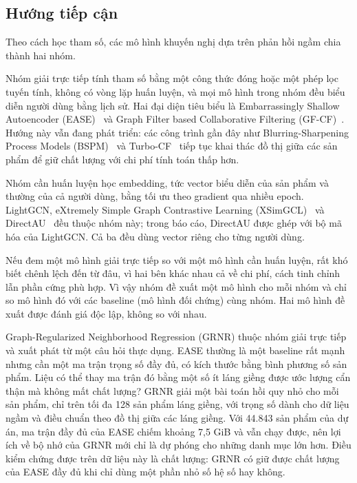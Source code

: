 \subsection{Hướng tiếp cận}
\label{sec:intro-approach}

Theo cách học tham số, các mô hình khuyến nghị dựa trên phản hồi ngầm chia thành hai nhóm.

Nhóm giải trực tiếp tính tham số bằng một công thức đóng hoặc một phép lọc tuyến tính, không có vòng lặp huấn luyện, và mọi mô hình trong nhóm đều biểu diễn người dùng bằng lịch sử. Hai đại diện tiêu biểu là Embarrassingly Shallow Autoencoder (EASE)~\cite{steck2019ease} và Graph Filter based Collaborative Filtering (GF-CF)~\cite{shen2021gfcf}. Hướng này vẫn đang phát triển: các công trình gần đây như Blurring-Sharpening Process Models (BSPM)~\cite{choi2023bspm} và Turbo-CF~\cite{park2024turbocf} tiếp tục khai thác đồ thị giữa các sản phẩm để giữ chất lượng với chi phí tính toán thấp hơn.

Nhóm cần huấn luyện học embedding, tức vector biểu diễn của sản phẩm và thường của cả người dùng, bằng tối ưu theo gradient qua nhiều epoch. LightGCN, eXtremely Simple Graph Contrastive Learning (XSimGCL)~\cite{yu2023xsimgcl} và DirectAU~\cite{wang2022directau} đều thuộc nhóm này; trong báo cáo, DirectAU được ghép với bộ mã hóa của LightGCN. Cả ba đều dùng vector riêng cho từng người dùng.

Nếu đem một mô hình giải trực tiếp so với một mô hình cần huấn luyện, rất khó biết chênh lệch đến từ đâu, vì hai bên khác nhau cả về chi phí, cách tinh chỉnh lẫn phần cứng phù hợp. Vì vậy nhóm đề xuất một mô hình cho mỗi nhóm và chỉ so mô hình đó với các baseline (mô hình đối chứng) cùng nhóm. Hai mô hình đề xuất được đánh giá độc lập, không so với nhau.

Graph-Regularized Neighborhood Regression (GRNR) thuộc nhóm giải trực tiếp và xuất phát từ một câu hỏi thực dụng. EASE thường là một baseline rất mạnh nhưng cần một ma trận trọng số đầy đủ, có kích thước bằng bình phương số sản phẩm. Liệu có thể thay ma trận đó bằng một số ít láng giềng được ước lượng cẩn thận mà không mất chất lượng? GRNR giải một bài toán hồi quy nhỏ cho mỗi sản phẩm, chỉ trên tối đa 128 sản phẩm láng giềng, với trọng số dành cho dữ liệu ngầm và điều chuẩn theo đồ thị giữa các láng giềng. Với 44.843 sản phẩm của dự án, ma trận đầy đủ của EASE chiếm khoảng 7,5 GiB và vẫn chạy được, nên lợi ích về bộ nhớ của GRNR mới chỉ là dự phóng cho những danh mục lớn hơn. Điều kiểm chứng được trên dữ liệu này là chất lượng: GRNR có giữ được chất lượng của EASE đầy đủ khi chỉ dùng một phần nhỏ số hệ số hay không.

